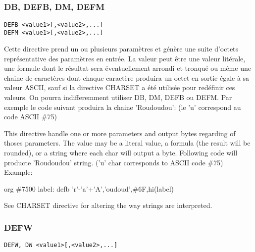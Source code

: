 \subsection{}

\subsubsection{DB, DEFB, DM, DEFM}

\begin{verbatim}
DEFB <value1>[,<value2>,...]
DEFM <value1>[,<value2>,...]
\end{verbatim}

\begin{xfr}
Cette directive prend un ou plusieurs paramètres et génère une suite d'octets représentative des paramètres en entrée. La valeur peut être une valeur litérale, une formule dont le résultat sera éventuellement arrondi et tronqué ou même une chaine de caractères dont chaque caractère produira un octet en sortie égale à sa valeur ASCII, sauf si la directive CHARSET a été utilisée pour redéfinir ces valeurs. On pourra indifferemment utiliser DB, DM, DEFB ou DEFM.
Par exemple le code suivant produira la chaine 'Roudoudou': (le 'u' correspond au code ASCII \#75)
\end{xfr}

\begin{xen}
This directive handle one or more parameters and output bytes regarding of thoses parameters. The value may be a literal value, a formula (the result will be rounded), or a string where each char will output a byte.
Following code will producte 'Roudoudou' string. ('u' char corresponds to ASCII code \#75)
Example:
\end{xen}
\begin{code}
org \#7500
label:
defb 'r'-'a'+'A','oudoud',\#6F,hi(label)
\end{code}


See CHARSET directive for altering the way strings are interpreted.

\subsubsection{DEFW}

\begin{verbatim}
DEFW, DW <value1>[,<value2>,...]
\end{verbatim}

